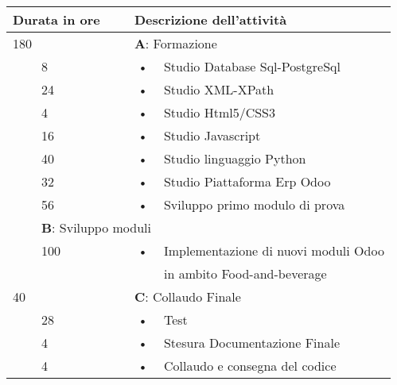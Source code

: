 \begin{center}
	\begin{tabular}{|l|l|c l|}
		\hline
		\multicolumn{2}{|l|}{\textbf{Durata in ore}}		&	\multicolumn{2}{l|}{\textbf{Descrizione dell'attività}}\\
		\hline
		\multicolumn{2}{|l|}{180}	&	\multicolumn{2}{l|}{\textbf{A}: Formazione}\\
		\hline
		\multirow{5}{1cm}{ } & 8  & \hspace{5mm}•\hspace{2mm} & Studio Database Sql-PostgreSql \\
		\multirow{5}{1cm}{ } & 24 & \hspace{5mm}•\hspace{2mm} & Studio XML-XPath                 \\
		\multirow{5}{1cm}{ } & 4 & \hspace{5mm}•\hspace{2mm} & Studio Html5/CSS3\\
		\multirow{5}{1cm}{ } & 16 & \hspace{5mm}•\hspace{2mm} & Studio Javascript\\
		\multirow{5}{1cm}{ } & 40 & \hspace{5mm}•\hspace{2mm} & Studio linguaggio Python\\
		\multirow{5}{1cm}{ } & 32 & \hspace{5mm}•\hspace{2mm} & Studio Piattaforma Erp Odoo\\
		\multirow{5}{1cm}{ } & 56  & \hspace{5mm}•\hspace{2mm} & Sviluppo primo modulo di prova \\
		\hline																											
		\multicolumn{2}{|l|}{100}	&	\multicolumn{2}{l|}{\textbf{B}: Sviluppo moduli}\\
		\hline
		\multirow{5}{1cm}{ } & 100  & \hspace{5mm}•\hspace{2mm} & Implementazione di nuovi moduli Odoo  \\ & & & in ambito Food-and-beverage\\
		\hline
		
		\multicolumn{2}{|l|}{40}	&	\multicolumn{2}{l|}{\textbf{C}: Collaudo Finale}\\
		\hline
		\multirow{5}{1cm}{ } & 28  & \hspace{5mm}•\hspace{2mm} & Test\\
		\multirow{5}{1cm}{ } & 4 & \hspace{5mm}•\hspace{2mm} & Stesura Documentazione Finale \\
		\multirow{5}{1cm}{ } & 4 & \hspace{5mm}•\hspace{2mm} & Collaudo e consegna del codice\\
		

\end{tabular}
\end{center}
